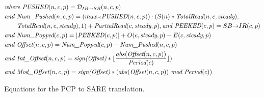 \begin{figure}[t]
{\begin{minipage}{6.3in}
\begin{itemize}
\begin{align}
%
%
&\mt{where }\mt{PUSHED}(n,c,p) = {\cal D}_{IB {\small \rightarrow} SR}(n,c,p) \nonumber\\ \nonumber
&\mt{and }\mt{Num\_Pushed}(n,c,p) = 
  (max_{\preceq}\mt{PUSHED}(n,c,p)) \cdot (S(n) * \mt{TotalRead}(n,c,\mt{steady}), \\ \nonumber
                                        &~~~~~~\mt{TotalRead}(n,c,\mt{steady}),
                                        1 ) + \mt{PartialRead}(c, \mt{steady}, p),
\mt{and }\mt{PEEKED}(c,p) = {SB {\small \rightarrow} IR}(c,p) \\ \nonumber
&\mt{and }\mt{Num\_Popped}(c,p) = |\mt{PEEKED}(c,p)| + O(c,\mt{steady},p) - E(c,\mt{steady},p) \\
&\mt{and }\mt{Offset}(n,c,p) = \mt{Num\_Popped}(c,p)-\mt{Num\_Pushed}(n,c,p) \\ \nonumber
&\mt{and }\mt{Int\_Offset}(n,c,p) = \mt{sign(Offset)}*\lfloor \frac{abs(\mt{Offset}(n,c,p))}{\mt{Period}(c)} \rfloor) \\ \nonumber
&\mt{and }\mt{Mod\_Offset}(n,c,p) = \mt{sign(Offset)}*(abs(\mt{Offset}(n,c,p))~\mt{mod}~\mt{Period}(c))
%
\end{align}
%
\end{itemize}
\end{minipage}}
\caption{Equations for the PCP to SARE translation.
\protect\label{fig:pcptosare3}}
\end{figure}